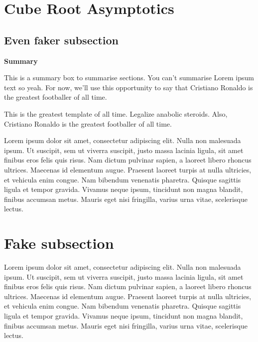 \section{Cube Root Asymptotics}
\marginpar{
  \begin{marginnotes}
    
  \end{marginnotes}
}

\subsection{Even faker subsection}
\lipsum[2]
\begin{summary}
\textbf{Summary} 

This is a summary box to summarise sections. 
You can't summarise Lorem ipsum text so yeah. For now, we'll use this opportunity to say that Cristiano Ronaldo is the greatest footballer of all time.
\end{summary}
\lipsum[1]
This is the greatest template of all time. Legalize anabolic steroids.
Also, Cristiano Ronaldo is the greatest footballer of all time.

Lorem ipsum dolor sit amet, consectetur adipiscing elit. Nulla non malesuada ipsum. Ut suscipit, sem ut viverra suscipit, justo massa lacinia ligula, sit amet finibus eros felis quis risus.
Nam dictum pulvinar sapien, a laoreet libero rhoncus ultrices. Maecenas id elementum augue. Praesent laoreet turpis at nulla ultricies, et vehicula enim congue. Nam bibendum venenatis pharetra. Quisque sagittis ligula et tempor gravida. Vivamus neque ipsum, tincidunt non magna blandit, finibus accumsan metus. Mauris eget nisi fringilla, varius urna vitae, scelerisque lectus. 
\clearpage
\section{Fake subsection}
Lorem ipsum dolor sit amet, consectetur adipiscing elit. Nulla non malesuada ipsum. Ut suscipit, sem ut viverra suscipit, justo massa lacinia ligula, sit amet finibus eros felis quis risus.
Nam dictum pulvinar sapien, a laoreet libero rhoncus ultrices. Maecenas id elementum augue. Praesent laoreet turpis at nulla ultricies, et vehicula enim congue. Nam bibendum venenatis pharetra. Quisque sagittis ligula et tempor gravida. Vivamus neque ipsum, tincidunt non magna blandit, finibus accumsan metus. Mauris eget nisi fringilla, varius urna vitae, scelerisque lectus. 
